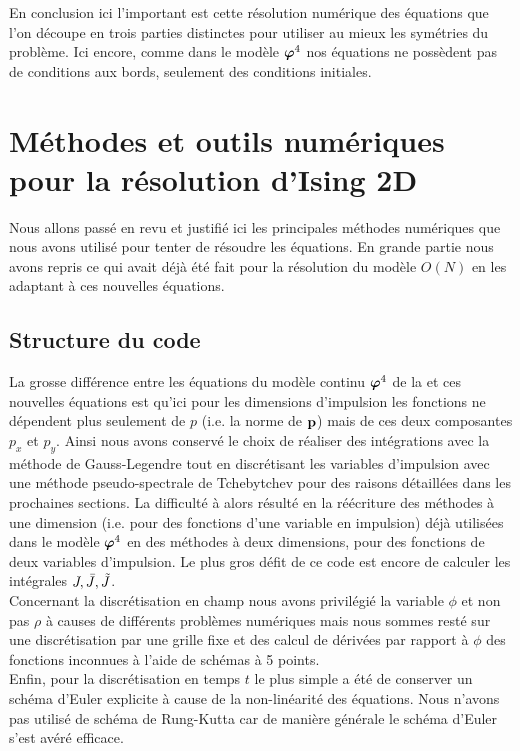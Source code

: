 \documentclass[10pt]{article}
\begin{document}
\begin{multicols}{2}
En conclusion ici l'important est cette résolution numérique des équations que l'on découpe en trois parties distinctes pour utiliser au mieux les symétries du problème. Ici encore, comme dans le modèle $\boldsymbol{ \varphi}^4$ nos équations ne possèdent pas de conditions aux bords, seulement des conditions initiales.



\section{Méthodes et outils numériques pour la résolution d'Ising 2D}

Nous allons passé en revu et justifié ici les principales méthodes numériques que nous avons utilisé pour tenter de résoudre les équations. En grande partie nous avons repris ce qui avait déjà été fait pour la résolution du modèle $O(N)$ en les adaptant à ces nouvelles équations.


\subsection{Structure du code}

La grosse différence entre les équations du modèle continu $\boldsymbol{ \varphi}^4$ de la  et ces nouvelles équations est qu'ici pour les dimensions d'impulsion les fonctions ne dépendent plus seulement de $p$ (i.e. la norme de ${\bf p}$) mais de ces deux composantes $p_x$ et $p_y$. Ainsi nous avons conservé le choix de réaliser des intégrations avec la méthode de Gauss-Legendre tout en discrétisant les variables d'impulsion avec une méthode pseudo-spectrale de Tchebytchev pour des raisons détaillées dans les prochaines sections. La difficulté à alors résulté en la réécriture des méthodes à une dimension (i.e. pour des fonctions d'une variable en impulsion) déjà utilisées dans le modèle $ \boldsymbol{ \varphi}^4$ en des méthodes à deux dimensions, pour des fonctions de deux variables d'impulsion. Le plus gros défit de ce code est encore de calculer les intégrales $J, \bar{J}, \tilde{J}$. \\

Concernant la discrétisation en champ nous avons privilégié la variable $\phi$ et non pas $\rho$ à causes de différents problèmes numériques mais nous sommes resté sur une discrétisation par une grille fixe et des calcul de dérivées par rapport à $\phi$ des fonctions inconnues à l'aide de schémas à 5 points. \\


Enfin, pour la discrétisation en temps $t$ le plus simple a été de conserver un schéma d'Euler explicite à cause de la non-linéarité des équations. Nous n'avons pas utilisé de schéma de Rung-Kutta car de manière générale le schéma d'Euler s'est avéré efficace.\\


\end{multicols}
\end{document}
